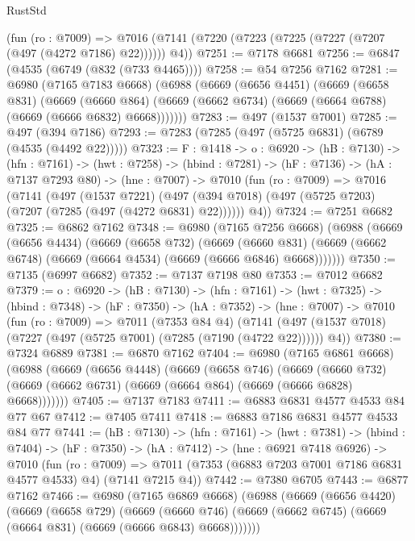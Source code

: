 \begin{lexlean}{RustStd}
\begin{coremodule}
    (fun (ro : @7009) =>
    @7016 (@7141 (@7220 (@7223 (@7225 (@7227 (@7207 (@497 (@4272 @7186) @22)))))) @4))
@7251 := @7178 @6681
@7256 := @6847 (@4535 (@6749 (@832 (@733 @4465))))
@7258 := @54 @7256 @7162
@7281 := @6980
    (@7165 @7183 @6668)
    (@6988
      (@6669
        (@6656 @4451)
        (@6669
          (@6658 @831)
          (@6669
            (@6660 @864)
            (@6669 (@6662 @6734) (@6669 (@6664 @6788) (@6669 (@6666 @6832) @6668)))))))
@7283 := @497 (@1537 @7001)
@7285 := @497 (@394 @7186)
@7293 := @7283 (@7285 (@497 (@5725 @6831) (@6789 (@4535 (@4492 @22)))))
@7323 := {F : @1418} ->
  {o : @6920} ->
  (hB : @7130) ->
  (hfn : @7161) ->
  (hwt : @7258) ->
  (hbind : @7281) ->
  (hF : @7136) ->
  (hA : @7137 @7293 @80) ->
  (hne : @7007) ->
  @7010
    (fun (ro : @7009) =>
    @7016
      (@7141
        (@497
          (@1537 @7221)
          (@497 (@394 @7018) (@497 (@5725 @7203) (@7207 (@7285 (@497 (@4272 @6831) @22))))))
        @4))
@7324 := @7251 @6682
@7325 := @6862 @7162
@7348 := @6980
    (@7165 @7256 @6668)
    (@6988
      (@6669
        (@6656 @4434)
        (@6669
          (@6658 @732)
          (@6669
            (@6660 @831)
            (@6669 (@6662 @6748) (@6669 (@6664 @4534) (@6669 (@6666 @6846) @6668)))))))
@7350 := @7135 (@6997 @6682)
@7352 := @7137 @7198 @80
@7353 := @7012 @6682
@7379 := {o : @6920} ->
  (hB : @7130) ->
  (hfn : @7161) ->
  (hwt : @7325) ->
  (hbind : @7348) ->
  (hF : @7350) ->
  (hA : @7352) ->
  (hne : @7007) ->
  @7010
    (fun (ro : @7009) =>
    @7011
      (@7353 @84 @4)
      (@7141 (@497 (@1537 @7018) (@7227 (@497 (@5725 @7001) (@7285 (@7190 (@4722 @22)))))) @4))
@7380 := @7324 @6889
@7381 := @6870 @7162
@7404 := @6980
    (@7165 @6861 @6668)
    (@6988
      (@6669
        (@6656 @4448)
        (@6669
          (@6658 @746)
          (@6669
            (@6660 @732)
            (@6669 (@6662 @6731) (@6669 (@6664 @864) (@6669 (@6666 @6828) @6668)))))))
@7405 := @7137 @7183
@7411 := @6883 @6831 @4577 @4533 @84 @77 @67
@7412 := @7405 @7411
@7418 := @6883 @7186 @6831 @4577 @4533 @84 @77
@7441 := (hB : @7130) ->
  (hfn : @7161) ->
  (hwt : @7381) ->
  (hbind : @7404) ->
  (hF : @7350) ->
  (hA : @7412) ->
  (hne : @6921 @7418 @6926) ->
  @7010
    (fun (ro : @7009) =>
    @7011 (@7353 (@6883 @7203 @7001 @7186 @6831 @4577 @4533) @4) (@7141 @7215 @4))
@7442 := @7380 @6705
@7443 := @6877 @7162
@7466 := @6980
    (@7165 @6869 @6668)
    (@6988
      (@6669
        (@6656 @4420)
        (@6669
          (@6658 @729)
          (@6669
            (@6660 @746)
            (@6669 (@6662 @6745) (@6669 (@6664 @831) (@6669 (@6666 @6843) @6668)))))))

\end{coremodule}
\end{lexlean}
